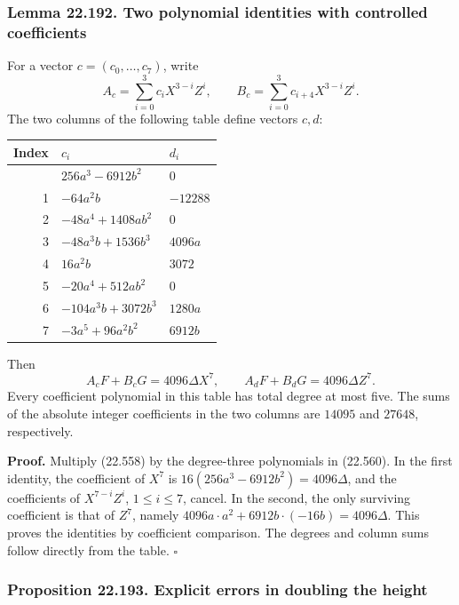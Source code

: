 \documentclass[
  11pt,
  a4paper,
]{article}
\newcounter{none} %
\begin{document}
\subsubsection{Lemma 22.192. Two polynomial identities with controlled
coefficients}\label{lemma-22.192.-two-polynomial-identities-with-controlled-coefficients}

For a vector \(c=(c_0,\ldots,c_7)\), write \[
 A_c=\sum_{i=0}^3c_iX^{3-i}Z^i,\qquad
 B_c=\sum_{i=0}^3c_{i+4}X^{3-i}Z^i.
 \tag{22.560}
\] The two columns of the following table define vectors \(c,d\):

{\def\LTcaptype{none} %
\begin{longtable}[]{@{}rll@{}}
\toprule\noalign{}
Index & \(c_i\) & \(d_i\) \\
\midrule\noalign{}
\endhead
\bottomrule\noalign{}
\endlastfoot
0 & \(256a^3-6912b^2\) & \(0\) \\
1 & \(-64a^2b\) & \(-12288\) \\
2 & \(-48a^4+1408ab^2\) & \(0\) \\
3 & \(-48a^3b+1536b^3\) & \(4096a\) \\
4 & \(16a^2b\) & \(3072\) \\
5 & \(-20a^4+512ab^2\) & \(0\) \\
6 & \(-104a^3b+3072b^3\) & \(1280a\) \\
7 & \(-3a^5+96a^2b^2\) & \(6912b\) \\
\end{longtable}
}

Then \[
 A_cF+B_cG=4096\Delta X^7,\qquad
 A_dF+B_dG=4096\Delta Z^7.
 \tag{22.561}
\] Every coefficient polynomial in this table has total degree at most
five. The sums of the absolute integer coefficients in the two columns
are \(14095\) and \(27648\), respectively.

\textbf{Proof.} Multiply (22.558) by the degree-three polynomials in
(22.560). In the first identity, the coefficient of \(X^7\) is
\(16(256a^3-6912b^2)=4096\Delta\), and the coefficients of
\(X^{7-i}Z^i\), \(1\le i\le7\), cancel. In the second, the only
surviving coefficient is that of \(Z^7\), namely
\(4096a\cdot a^2+6912b\cdot(-16b)=4096\Delta\). This proves the
identities by coefficient comparison. The degrees and column sums follow
directly from the table. \(\square\)

\subsubsection{Proposition 22.193. Explicit errors in doubling the
height}\label{proposition-22.193.-explicit-errors-in-doubling-the-height}
\end{document}

